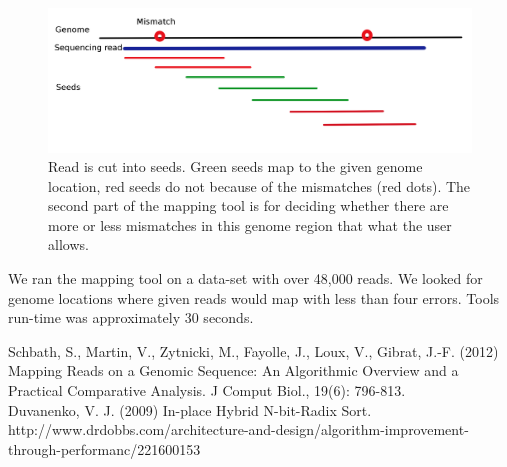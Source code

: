 \documentclass[portrait, a0paper, margin=7cm]{baposter}
\begin{document}
\begin{poster}
{\begin{figure}[H]
\begin{center}
\includegraphics[scale=0.5]{map}
\caption{Read is cut into seeds. Green seeds map to the given genome location, red seeds do not because of the mismatches (red dots). The second part of the mapping tool is for deciding whether there are more or less mismatches in this genome region that what the user allows.}
\end{center}
\end{figure}

We ran the mapping tool on a data-set with over 48,000 reads. We looked for genome locations where given reads would map with less than four errors. Tools run-time was approximately 30 seconds.

}

 {

\smaller %

Schbath, S., Martin, V., Zytnicki, M., Fayolle, J., Loux, V., Gibrat, J.-F. (2012) Mapping Reads on a Genomic Sequence: An Algorithmic Overview and a Practical Comparative Analysis. J Comput Biol., 19(6): 796-813.\\

Duvanenko, V. J. (2009) In-place Hybrid N-bit-Radix Sort. http://www.drdobbs.com/architecture-and-design/algorithm-improvement-through-performanc/221600153\\
}


\end{poster}
\end{document}

